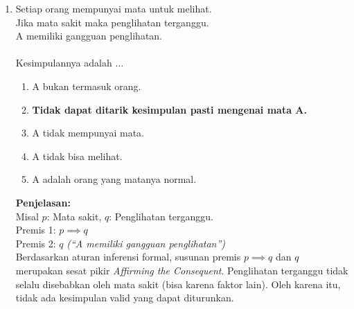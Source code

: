 \begin{multicols}{2}
\begin{enumerate}
\begin{enumerate}
    \item Supri tidak ikut bersih-bersih ruangan.
    \item \textbf{Supri bukan pekerja kantor.}
    \item Supri ikut bersih-bersih ruangan atau bukan pekerja kantor.
    \item Supri pekerja kantor dan kantornya tidak mengadakan bersih-bersih ruangan.
    \item Supri bukan pekerja kantor dan ikut bersih bersih ruangan.
    \end{enumerate}
    \textbf{Penjelasan: } \\
    Misal $p$: Pekerja kantor, $q$: Masuk hari ini. \\
    Premis 1: $p \implies q$ \textit{(``Semua pekerja masuk kantor'')} \\
    Premis 2: $\neg q$ \textit{(``Supri tidak masuk'')} \\
    Modus Tollens: $\neg p$ \textit{(``Supri bukan pekerja kantor'')}. Keterangan bersih-bersih adalah pengecoh.
  \item Setiap orang mempunyai mata untuk melihat. \\
    Jika mata sakit maka penglihatan terganggu. \\
    A memiliki gangguan penglihatan. \\ \\
    Kesimpulannya adalah $\dots$
    \begin{enumerate}
    \item A bukan termasuk orang.
    \item \textbf{Tidak dapat ditarik kesimpulan pasti mengenai mata A.}
    \item A tidak mempunyai mata.
    \item A tidak bisa melihat.
    \item A adalah orang yang matanya normal.
    \end{enumerate}
    \textbf{Penjelasan: } \\
    Misal $p$: Mata sakit, $q$: Penglihatan terganggu. \\
    Premis 1: $p \implies q$ \\
    Premis 2: $q$ \textit{(``A memiliki gangguan penglihatan'')} \\
    Berdasarkan aturan inferensi formal, susunan premis $p \implies q$ dan $q$ merupakan sesat pikir \textit{Affirming the Consequent}. Penglihatan terganggu tidak selalu disebabkan oleh mata sakit (bisa karena faktor lain). Oleh karena itu, tidak ada kesimpulan valid yang dapat diturunkan.

\end{enumerate}
\end{multicols}
